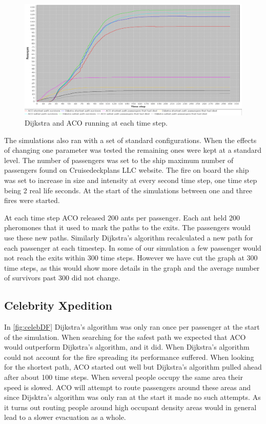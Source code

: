 \begin{figure} [float]
\centering
\hspace*{-1.0in}
\includegraphics[scale=0.35]{images/Graph-using-200-rounds-140-passangers-and-one-fire.png}
\caption{Dijkstra and ACO running at each time step.}
\label{fig:celeb}
\end{figure}
The simulations also ran with a set of standard configurations. When the effects of changing one parameter was tested the remaining ones were kept at a standard level. The number of passengers was set to the ship maximum number of passengers found on Cruisedeckplans LLC website\cite{cruseships}. The fire on board the ship was set to increase in size and intensity at every second time step, one time step being 2 real life seconds. At the start of the simulations between one and three fires were started.

At each time step ACO released 200 ants per passenger. Each ant held 200 pheromones that it used to mark the paths to the exits. The passengers would use these new paths. Similarly Dijkstra's algorithm recalculated a new path for each passenger at each timestep. In some of our simulation a few passenger would not reach the exits within 300 time steps. However we have cut the graph at 300 time steps, as this would show more details in the graph and the average number of survivors past 300 did not change. 

\subsection{Celebrity Xpedition}

In \ref{fig:celebDF} Dijkstra's algorithm was only ran once per passenger at the start of the simulation. When searching for the safest path we expected that ACO would outperform Dijkstra's algorithm, and it did. When Dijkstra's algorithm could not account for the fire spreading its performance suffered. When looking for the shortest path, ACO started out well but Dijkstra's algorithm pulled ahead after about 100 time steps. When several people occupy the same area their speed is slowed. ACO will attempt to route passengers around these areas and since Dijsktra's algorithm was only ran at the start it made no such attempts. As it turns out routing people around high occupant density areas would in general lead to a slower evacuation as a whole.

